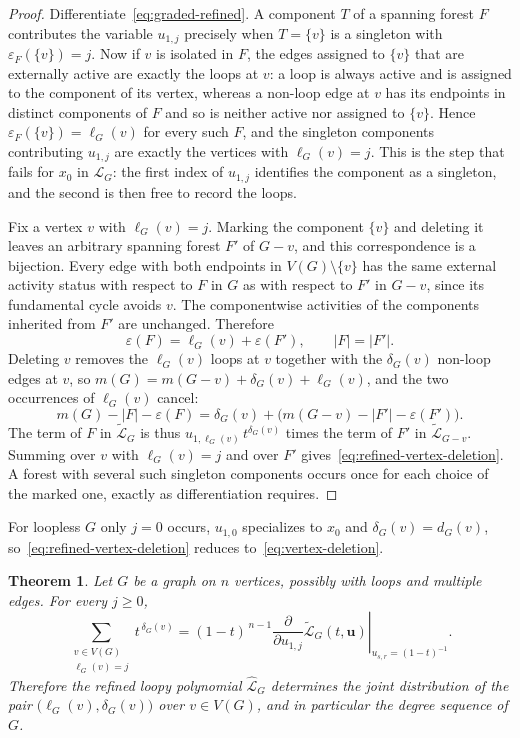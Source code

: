 \documentclass[11pt]{article}
\theoremstyle{plain}
\newtheorem{theorem}{Theorem}[section]
\theoremstyle{definition}
\renewcommand{\mathcal}{\mathscr}
\newcommand{\LL}{\mathcal{L}}    %
\newcommand{\bu}{\mathbf{u}}
\newcommand{\eps}{\varepsilon}
\numberwithin{equation}{section}
\begin{document}
\begin{proof}
Differentiate~\eqref{eq:graded-refined}.  A component $T$ of a spanning
forest $F$ contributes the variable $u_{1,j}$ precisely when $T=\{v\}$ is a
singleton with $\eps_F(\{v\})=j$.  Now if $v$ is isolated in $F$, the
edges assigned to $\{v\}$ that are externally active are exactly the loops at
$v$: a loop is always active and is assigned to the component of its vertex,
whereas a non-loop edge at $v$ has its endpoints in distinct components of
$F$ and so is neither active nor assigned to $\{v\}$.  Hence
$\eps_F(\{v\})=\ell_G(v)$ for every such $F$, and the singleton
components contributing $u_{1,j}$ are exactly the vertices with
$\ell_G(v)=j$.  This is the step that fails for $x_0$ in $\LL_G$: the first
index of $u_{1,j}$ identifies the component as a singleton, and the second is
then free to record the loops.

Fix a vertex $v$ with $\ell_G(v)=j$.  Marking the component $\{v\}$ and
deleting it leaves an arbitrary spanning forest $F'$ of $G-v$, and this
correspondence is a bijection.  Every edge with both endpoints in
$V(G)\setminus\{v\}$ has the same external activity status with respect to
$F$ in $G$ as with respect to $F'$ in $G-v$, since its fundamental cycle
avoids $v$. The componentwise activities of the components inherited from
$F'$ are unchanged.  Therefore
\[
   \eps(F)=\ell_G(v)+\eps(F'),
   \qquad
   |F|=|F'| .
\]
Deleting $v$ removes the $\ell_G(v)$ loops at $v$ together with the
$\delta_G(v)$ non-loop edges at $v$, so
$m(G)=m(G-v)+\delta_G(v)+\ell_G(v)$, and the two occurrences of $\ell_G(v)$
cancel:
\[
   m(G)-|F|-\eps(F)
   =
   \delta_G(v)+\bigl(m(G-v)-|F'|-\eps(F')\bigr).
\]
The term of $F$ in $\widetilde{\LL}_G$ is thus
$u_{1,\ell_G(v)}\,t^{\delta_G(v)}$ times the term of $F'$ in
$\widetilde{\LL}_{G-v}$.  Summing over $v$ with $\ell_G(v)=j$ and over $F'$
gives~\eqref{eq:refined-vertex-deletion}.  A forest with several such
singleton components occurs once for each choice of the marked one, exactly
as differentiation requires.
\end{proof}

For loopless $G$ only $j=0$ occurs, $u_{1,0}$ specializes to $x_0$ and
$\delta_G(v)=d_G(v)$, so~\eqref{eq:refined-vertex-deletion} reduces
to~\eqref{eq:vertex-deletion}.


\begin{theorem}\label{thm:degree-sequence-loops}
Let $G$ be a graph on $n$ vertices, possibly with loops and multiple edges.
For every $j\ge 0$,
\begin{equation}\label{eq:loop-degree-generating-function}
   \sum_{\substack{v\in V(G)\\ \ell_G(v)=j}} t^{\,\delta_G(v)}
   =
   (1-t)^{\,n-1}
   \left.
      \frac{\partial}{\partial u_{1,j}}\widetilde{\LL}_G(t,\bu)
   \right|_{u_{s,r}=(1-t)^{-1}} .
\end{equation}
Therefore the refined loopy polynomial $\widehat{\LL}_G$ determines the
joint distribution of the pair $\bigl(\ell_G(v),\delta_G(v)\bigr)$ over
$v\in V(G)$, and in particular the degree sequence of $G$.
\end{theorem}
\end{document}
